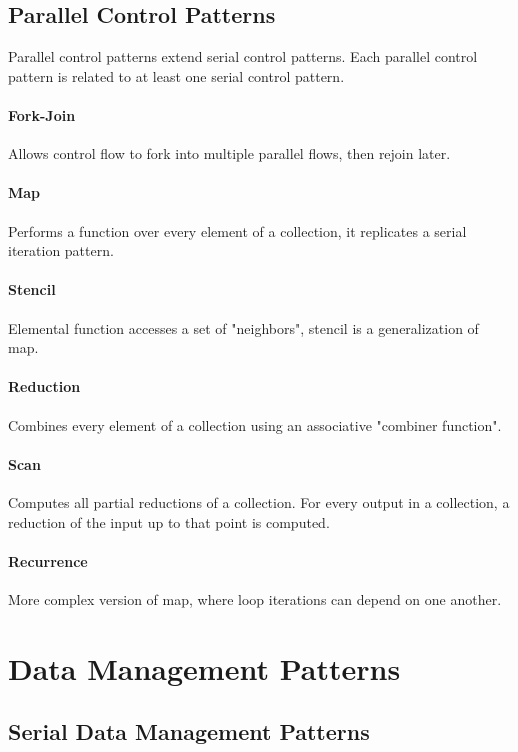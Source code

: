 \subsection{Parallel Control Patterns}
Parallel control patterns extend serial control patterns.
Each parallel control pattern is related to at least one serial control pattern.

\paragraph{Fork-Join}
Allows control flow to fork into multiple parallel flows, then rejoin later.

\paragraph{Map}
Performs a function over every element of a collection, it replicates a serial iteration pattern.

\paragraph{Stencil}
Elemental function accesses a set of "neighbors", stencil is a generalization of map.

\paragraph{Reduction}
Combines every element of a collection using an associative "combiner function".

\paragraph{Scan}
Computes all partial reductions of a collection.
For every output in a collection, a reduction of the input up to that point is computed.

\paragraph{Recurrence}
More complex version of map, where loop iterations can depend on one another.

\section{Data Management Patterns}

\subsection{Serial Data Management Patterns}

